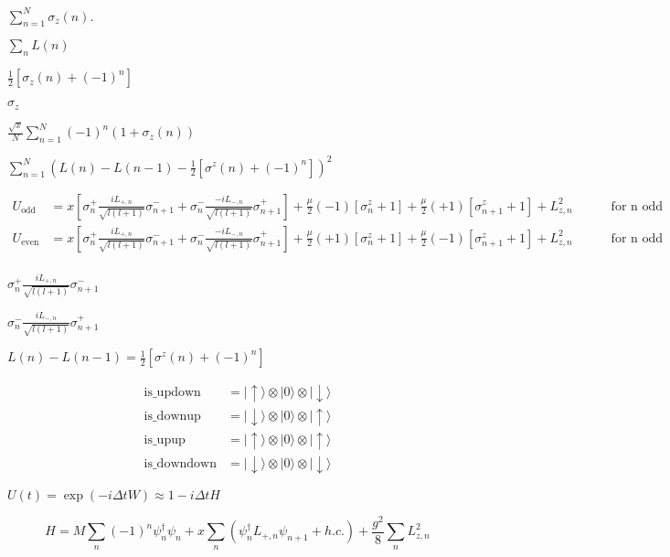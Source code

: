 \documentclass{article}
\begin{document}
{$ \sum_{n=1}^N \sigma_z(n). $
\pagebreak

$ \sum_nL(n) $
\pagebreak

$ \frac{1}{2}[\sigma_z(n) + (-1)^n] $
\pagebreak

$ \sigma_z $
\pagebreak

$ \frac{\sqrt{x}}{N}\sum_{n=1}^N\left(-1\right)^n(1+\sigma_z(n)) $
\pagebreak

$ \sum_{n=1}^N\left(L(n)-L(n-1)-\frac{1}{2}\left[\sigma^z(n)+(-1)^n\right]\right)^2 $
\pagebreak

\begin{eqnarray*}
U_\mathrm{odd} &= x\left[\sigma^+_{n}\frac{iL_{+,n}}{\sqrt{l(l+1)}}\sigma^-_{n+1} +  \sigma^-_n \frac{-iL_{-,n}}{\sqrt{l(l+1)}}\sigma^+_{n+1} \right] + \frac{\mu}{2}(-1)\left[\sigma^z_n+1\right] + \frac{\mu}{2}(+1)\left[\sigma^z_{n+1}+1\right] + L_{z,n}^2\quad\quad\quad\mbox{for n odd} \\
U_\mathrm{even} &= x\left[\sigma^+_{n}\frac{iL_{+,n}}{\sqrt{l(l+1)}}\sigma^-_{n+1} +  \sigma^-_n \frac{-iL_{-,n}}{\sqrt{l(l+1)}}\sigma^+_{n+1} \right] + \frac{\mu}{2}(+1)\left[\sigma^z_n+1\right] + \frac{\mu}{2}(-1)\left[\sigma^z_{n+1}+1\right] + L_{z,n}^2\quad\quad\quad\mbox{for n odd} \\
\end{eqnarray*}
\pagebreak

$ \sigma^+_{n}\frac{iL_{+,n}}{\sqrt{l(l+1)}}\sigma^-_{n+1} $
\pagebreak

$ \sigma^-_{n}\frac{iL_{-,n}}{\sqrt{l(l+1)}}\sigma^+_{n+1} $
\pagebreak

$ L(n)-L(n-1) = \frac{1}{2}\left[\sigma^z(n)+(-1)^n\right]$
\pagebreak

\begin{eqnarray*}
\mathrm{is\_updown} &= |\uparrow\rangle\otimes |0\rangle\otimes |\downarrow\rangle \\
\mathrm{is\_downup} &= |\downarrow\rangle\otimes |0\rangle\otimes |\uparrow\rangle \\
\mathrm{is\_upup} &= |\uparrow\rangle\otimes |0\rangle\otimes |\uparrow\rangle \\
\mathrm{is\_downdown} &= |\downarrow\rangle\otimes |0\rangle\otimes |\downarrow\rangle
\end{eqnarray*}
\pagebreak

$ U(t)=\exp(-i\Delta t W)\approx 1 - i\Delta t H $
\pagebreak

\[ H = M\sum_n (-1)^n\psi_n^\dagger\psi_n + x\sum_n \left(\psi_n^\dagger L_{+,n}\psi_{n+1}+h.c.\right)+\frac{g^2}{8}\sum_n L_{z,n}^2\]
\pagebreak

}
\end{document}
